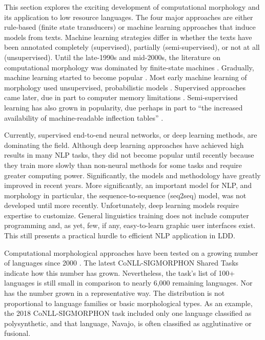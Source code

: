 \documentclass[12pt]{article}
\begin{document}
This section explores the exciting development of computational morphology and its application to low resource languages. The four major approaches are either  rule-based (finite state transducers) or machine learning approaches that induce models from texts. Machine learning strategies differ in whether the texts have been annotated completely (supervised), partially (semi-supervised), or not at all (unsupervised). Until the late-1990s and mid-2000s, the literature on computational morphology was dominated by finite-state machines \cite{kaplan_phonological_1981,koskenniemi_two-level_1983,beesley_finite-state_2003}. Gradually, machine learning started to become popular \cite{cohen_joint_2007,ruokolainen_comparative_2016}. Most early machine learning of morphology used unsupervised, probabilistic models \cite{roark_computational_2007}. Supervised approaches came later, due in part to computer memory limitations \cite{hammarstrom_unsupervised_2011}. Semi-supervised learning has also grown in popularity, due perhaps in part to ``the increased availability of machine-readable inflection tables'' \cite[page 18]{goldsmith_computational_2017}. 

Currently, supervised end-to-end neural networks, or deep learning methods, are dominating the field. Although deep learning approaches have achieved high results in many NLP tasks, they did not become popular until recently because they train more slowly than non-neural methods for some tasks \cite{cotterell_cross-lingual_2017} and require greater computing power. Significantly,  the models and methodology have greatly improved in recent years. More significantly, an important model for NLP, and morphology in particular, the sequence-to-sequence (seq2seq) model, was not developed until more recently. Unfortunately, deep learning models require expertise to customize. General linguistics training does not include computer programming and, as yet, few, if any, easy-to-learn graphic user interfaces exist. This still presents a practical hurdle to efficient NLP application in LDD.  

Computational morphological approaches have been tested on a growing number of languages since 2000 \cite{hammarstrom_unsupervised_2011}. The latest CoNLL-SIGMORPHON Shared Tasks \cite{cotterell_cross-lingual_2017,cotterell_conllsigmorphon_2018} indicate how this number has grown. Nevertheless, the task's list of 100+ languages is still small in comparison to nearly 6,000 remaining languages. Nor has the number grown in a representative way. The distribution is not proportional to language families or basic morphological types. As an example, the 2018 CoNLL-SIGMORPHON task included only one language classified as polysynthetic, and that language, Navajo, is often classified as agglutinative or fusional.
\end{document}
